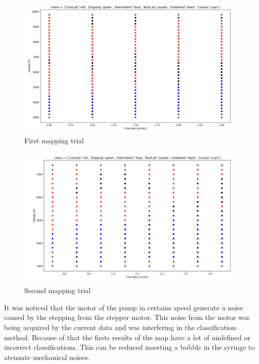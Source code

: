     \begin{figure}[H]
        \center
        \includegraphics[width=15cm]{images/map1.png}
        \caption{First mapping trial}
    \end{figure}

    \begin{figure}[H]
        \center
        \includegraphics[width=15cm]{images/map2.png}
        \caption{Second mapping trial}
    \end{figure}

    It was noticed that the motor of the pump in certains speed generate a noise caused by the stepping from the stepper motor.
    This noise from the motor was being acquired by the current data and was interfering in the classification method.
    Because of that the firsts results of the map have a lot of undefined or incorrect classifications.
    This can be reduced inserting a bubble in the syringe to atenuate mechanical noises. 



